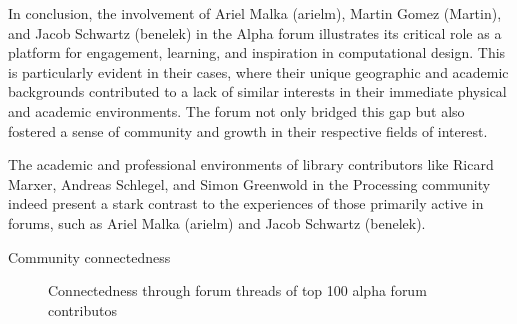 In conclusion, the involvement of Ariel Malka (arielm), Martin Gomez (Martin), and Jacob Schwartz (benelek) in the Alpha forum illustrates its critical role as a platform for engagement, learning, and inspiration in computational design. This is particularly evident in their cases, where their unique geographic and academic backgrounds contributed to a lack of similar interests in their immediate physical and academic environments. The forum not only bridged this gap but also fostered a sense of community and growth in their respective fields of interest.

The academic and professional environments of library contributors like Ricard Marxer, Andreas Schlegel, and Simon Greenwold in the Processing community indeed present a stark contrast to the experiences of those primarily active in forums, such as Ariel Malka (arielm) and Jacob Schwartz (benelek).

\changepapersize{305.3mm:210mm}

\begin{minipage}{147.3mm}
{
	\LARGE
	\noindent Community connectedness \par
}
\begin{figure}[H]
	\centering
	
	\caption{Connectedness through forum threads of top 100 alpha forum contributos}
	\label{figure:year}
\end{figure}
\end{minipage}

